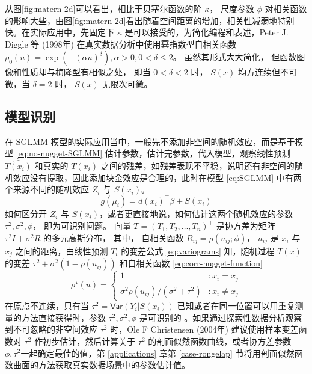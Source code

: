 \documentclass[12pt,a4paper,UTF8,twoside]{book}
\theoremstyle{definition}
\theoremstyle{definition}
\theoremstyle{definition}
\theoremstyle{remark}
\begin{document}
从图\ref{fig:matern-2d}可以看出，相比于贝塞尔函数的阶 \(\kappa\)，
尺度参数 \(\phi\)
对相关函数的影响大些，由图\ref{fig:matern-2d}看出随着空间距离的增加，相关性减弱地特别快。在实际应用中，先固定下
\(\kappa\) 是可以接受的，为简化编程和表述，Peter J. Diggle 等 (1998年)
\citep{Diggle1998} 在真实数据分析中使用幂指数型自相关函数
\(\rho_{0}(u) = \exp(-(\alpha u)^{\delta}), \alpha > 0, 0 < \delta \leq 2\)。
虽然其形式大大简化， 但函数图像和性质却与梅隆型有相似之处， 即当
\(0 < \delta < 2\) 时， \(S(x)\) 均方连续但不可微，当 \(\delta = 2\)
时， \(S(x)\) 无限次可微。

\hypertarget{subsec:identify}{%
\subsection{模型识别}\label{subsec:identify}}

在 SGLMM 模型的实际应用当中，一般先不添加非空间的随机效应，而是基于模型
\eqref{eq:no-nugget-SGLMM} 估计参数，估计完参数，代入模型，观察线性预测
\(\hat{T(x_{i})}\) 和真实的 \(T(x_i)\)
之间的残差，如残差表现不平稳，说明还有非空间的随机效应没有提取，因此添加块金效应是合理的，此时在模型
\eqref{eq:SGLMM} 中有两个来源不同的随机效应 \(Z_{i}\) 与 \(S(x_i)\)。
\begin{equation}
g(\mu_i) = d(x_i)^{\top}\beta + S(x_i) \label{eq:no-nugget-SGLMM}
\end{equation} 如何区分开 \(Z_{i}\) 与
\(S(x_i)\)，或者更直接地说，如何估计这两个随机效应的参数
\(\tau^2, \sigma^2, \phi\)， 即为可识别问题。 向量
\(T = (T_1,T_2,\ldots,T_n)^{\top}\) 是协方差为矩阵
\(\tau^2I + \sigma^2R\) 的多元高斯分布， 其中， 自相关函数
\(R_{ij} = \rho(u_{ij}; \phi)\)， \(u_{ij}\) 是 \(x_i\) 与 \(x_j\)
之间的距离，由线性预测 \(T_{i}\) 的变差公式 \eqref{eq:variograms}
知，随机过程 \(T(x)\) 的变差 \(\tau^2 + \sigma^2(1-\rho(u_{ij}))\)
和自相关函数 \eqref{eq:corr-nugget-function} \begin{equation}
\rho^{\star}(u) =
\begin{cases}
                                     1 & : x_{i} = x_{j}  \\
\sigma^2\rho(u_{ij})/(\sigma^2+\tau^2) & : x_{i} \neq x_{j}
\end{cases} \label{eq:corr-nugget-function}
\end{equation} \noindent 在原点不连续，只有当
\(\tau^2 = \mathsf{Var}(Y_i|S(x_i))\)
已知或者在同一位置可以用重复测量的方法直接获得时，参数
\(\tau^2, \sigma^2, \phi\) 是可识别的
\citep{Diggle2002Childhood, Diggle2007}。如果通过探索性数据分析观察到不可忽略的非空间效应
\(\tau^2\) 时，Ole F Christensen (2004年) \citep{Christensen2004}
建议使用样本变差函数对 \(\tau^2\) 作初步估计，然后计算关于 \(\tau^2\)
的剖面似然函数曲线，或者协方差参数 \(\phi,\tau^2\)一起确定最佳的值，第
\ref{applications} 章第 \ref{case-rongelap}
节将用剖面似然函数曲面的方法获取真实数据场景中的参数估计值。
\end{document}
